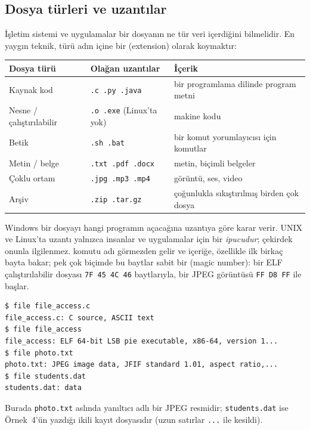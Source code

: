 \subsection{Dosya türleri ve uzantılar}

İşletim sistemi ve uygulamalar bir dosyanın ne tür veri içerdiğini bilmelidir. En yaygın teknik, türü adın içine bir  (extension) olarak koymaktır:

\begin{center}
\renewcommand{\arraystretch}{1.25}
\begin{tabular}{@{}lll@{}}
\toprule
\textbf{Dosya türü} & \textbf{Olağan uzantılar} & \textbf{İçerik} \\
\midrule
Kaynak kod & \texttt{.c .py .java} & bir programlama dilinde program metni \\
Nesne / çalıştırılabilir & \texttt{.o .exe} (Linux'ta yok) & makine kodu \\
Betik & \texttt{.sh .bat} & bir komut yorumlayıcısı için komutlar \\
Metin / belge & \texttt{.txt .pdf .docx} & metin, biçimli belgeler \\
Çoklu ortam & \texttt{.jpg .mp3 .mp4} & görüntü, ses, video \\
Arşiv & \texttt{.zip .tar.gz} & çoğunlukla sıkıştırılmış birden çok dosya \\
\bottomrule
\end{tabular}
\end{center}

Windows bir dosyayı hangi programın açacağına uzantıya göre karar verir. UNIX ve Linux'ta uzantı yalnızca insanlar ve uygulamalar için bir \emph{ipucudur}; çekirdek onunla ilgilenmez.  komutu adı görmezden gelir ve içeriğe, özellikle ilk birkaç bayta bakar; pek çok biçimde bu baytlar sabit bir  (magic number): bir ELF çalıştırılabilir dosyası \texttt{7F 45 4C 46} baytlarıyla, bir JPEG görüntüsü \texttt{FF D8 FF} ile başlar.

\begin{lstlisting}[style=term]
$ file file_access.c
file_access.c: C source, ASCII text
$ file file_access
file_access: ELF 64-bit LSB pie executable, x86-64, version 1...
$ file photo.txt
photo.txt: JPEG image data, JFIF standard 1.01, aspect ratio,...
$ file students.dat
students.dat: data
\end{lstlisting}
Burada \texttt{photo.txt} aslında yanıltıcı adlı bir JPEG resmidir; \texttt{students.dat} ise Örnek~4'ün yazdığı ikili kayıt dosyasıdır (uzun satırlar \texttt{...} ile kesildi).


